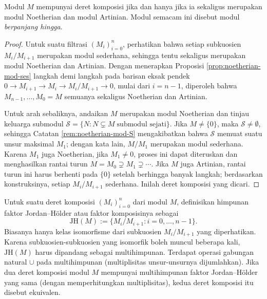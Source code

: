 \begin{lemma}\label{prop:mod-finite-length}
	Modul $M$ mempunyai deret komposisi jika dan hanya jika ia sekaligus merupakan modul Noetherian dan modul Artinian. Modul semacam ini disebut modul \emph{berpanjang hingga}.
\end{lemma}
\begin{proof}
	Untuk suatu filtrasi $(M_i)_{i=0}^n$, perhatikan bahwa setiap subkuosien $M_i/M_{i+1}$ merupakan modul sederhana, sehingga tentu sekaligus merupakan modul Noetherian dan Artinian. Dengan menerapkan Proposisi \ref{prop:noetherian-mod-ses} langkah demi langkah pada barisan eksak pendek $0 \to M_{i+1} \to M_i \to M_i/M_{i+1} \to 0$, mulai dari $i=n-1$, diperoleh bahwa $M_{n-1}, \ldots, M_0 = M$ semuanya sekaligus Noetherian dan Artinian.
	
	Untuk arah sebaliknya, andaikan $M$ merupakan modul Noetherian dan tinjau keluarga submodul $\mathcal{S} = \{N : N \subsetneq M \; \text{submodul sejati}\}$. Jika $M \neq \{0\}$, maka $\mathcal{S} \neq \emptyset$, sehingga Catatan \ref{rem:noetherian-mod-S} mengakibatkan bahwa $\mathcal{S}$ memuat suatu unsur maksimal $M_1$; dengan kata lain, $M/M_1$ merupakan modul sederhana. Karena $M_1$ juga Noetherian, jika $M_1 \neq 0$, proses ini dapat diteruskan dan menghasilkan rantai turun $M = M_0 \supsetneq M_1 \supsetneq \cdots$. Jika $M$ juga Artinian, rantai turun ini harus berhenti pada $\{0\}$ setelah berhingga banyak langkah; berdasarkan konstruksinya, setiap $M_i/M_{i+1}$ sederhana. Inilah deret komposisi yang dicari.
\end{proof}

Untuk suatu deret komposisi $(M_i)_{i=0}^n$ dari modul $M$, definisikan himpunan faktor Jordan--Hölder atau faktor komposisinya sebagai 
\[ \text{JH}(M) := \{M_i/M_{i+1} : i=0, \ldots, n-1 \}. \]
Biasanya hanya kelas isomorfisme dari subkuosien $M_i/M_{i+1}$ yang diperhatikan. Karena subkuosien-subkuosien yang isomorfik boleh muncul beberapa kali, $\text{JH}(M)$ harus dipandang sebagai multihimpunan. Terdapat operasi gabungan natural $\cup$ pada multihimpunan (multiplisitas unsur-unsurnya dijumlahkan). Jika dua deret komposisi modul $M$ mempunyai multihimpunan faktor Jordan--Hölder yang sama (dengan memperhitungkan multiplisitas), kedua deret komposisi itu disebut ekuivalen.

